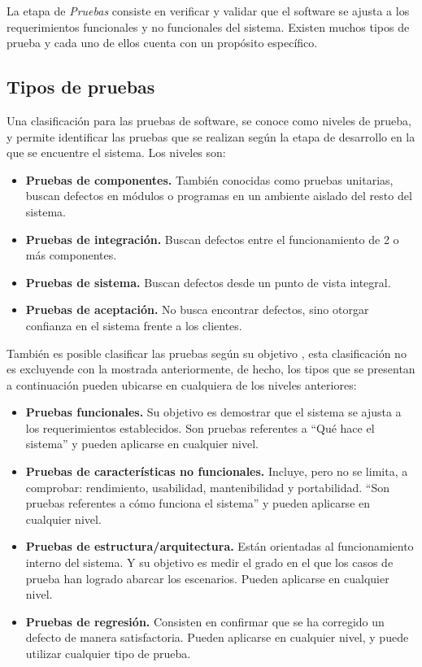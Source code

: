 La etapa de {\it Pruebas} consiste en verificar y validar que el software se ajusta a los requerimientos funcionales y no funcionales del sistema. Existen muchos tipos de prueba y cada uno de ellos cuenta con un propósito específico.

\subsection{Tipos de pruebas}

	Una clasificación para las pruebas de software, se conoce como niveles de prueba, y permite identificar las pruebas que se realizan según la etapa de desarrollo en la que se encuentre el sistema. Los niveles son:
\begin{itemize}
	\item {\bf Pruebas de componentes.} También conocidas como pruebas unitarias, buscan defectos en módulos o programas en un ambiente aislado del resto del sistema.
	\item {\bf Pruebas de integración.} Buscan defectos entre el funcionamiento de 2 o más componentes.
	\item {\bf Pruebas de sistema.} Buscan defectos desde un punto de vista integral.
	\item {\bf Pruebas de aceptación.} No busca encontrar defectos, sino otorgar confianza en el sistema frente a los clientes.
\end{itemize}

	También es posible clasificar las pruebas según su objetivo \cite{istqb2011}, esta clasificación no es excluyende con la mostrada anteriormente, de hecho, los tipos que se presentan a continuación pueden ubicarse en cualquiera de los niveles anteriores:

\begin{itemize}
	\item {\bf Pruebas funcionales.} Su objetivo es demostrar que el sistema se ajusta a los requerimientos establecidos. Son pruebas referentes a ``Qué hace el sistema'' y pueden aplicarse en cualquier nivel.
	\item {\bf Pruebas de características no funcionales.} Incluye, pero no se limita, a comprobar: rendimiento, usabilidad, mantenibilidad y portabilidad. ``Son pruebas referentes a cómo funciona el sistema'' y pueden aplicarse en cualquier nivel.	
	\item {\bf Pruebas de estructura/arquitectura.} Están orientadas al funcionamiento interno del sistema. Y su objetivo es medir el grado en el que los casos de prueba han logrado abarcar los escenarios. Pueden aplicarse en cualquier nivel.
	\item {\bf Pruebas de regresión.} Consisten en confirmar que se ha corregido un defecto de manera satisfactoria. Pueden aplicarse en cualquier nivel, y puede utilizar cualquier tipo de prueba.
\end{itemize}

